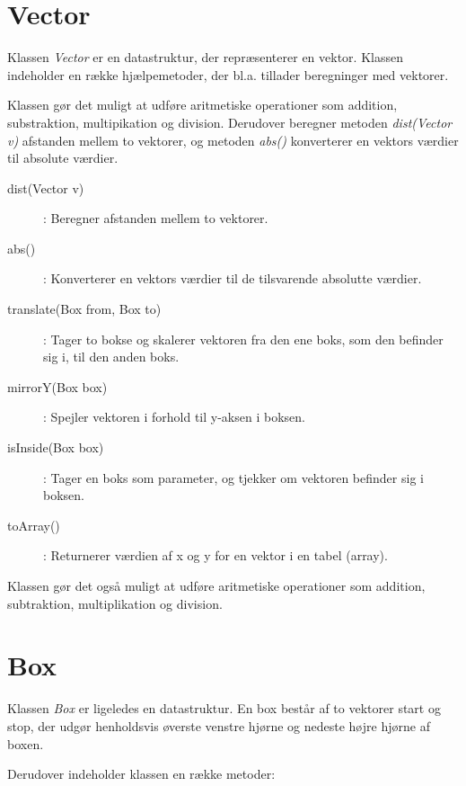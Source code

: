 \section{Vector}

Klassen \emph{Vector} er en datastruktur, der repræsenterer en vektor. Klassen indeholder en række hjælpemetoder, der bl.a. tillader beregninger med vektorer.

Klassen gør det muligt at udføre aritmetiske operationer som addition, substraktion, multipikation og division. Derudover beregner metoden \emph{dist(Vector v)} afstanden mellem to vektorer, og metoden \emph{abs()} konverterer en vektors værdier til absolute værdier.

\begin{description}
	\item [dist(Vector v)]: Beregner afstanden mellem to vektorer.
	\item [abs()]: Konverterer en vektors værdier til de tilsvarende absolutte værdier.
	\item [translate(Box from, Box to)]: Tager to bokse og skalerer vektoren fra den ene boks, som den befinder sig i, til den anden boks.
	\item [mirrorY(Box box)]: Spejler vektoren i forhold til y-aksen i boksen.
	\item [isInside(Box box)]: Tager en boks som parameter, og tjekker om vektoren befinder sig i boksen.
	\item [toArray()]: Returnerer værdien af x og y for en vektor i en tabel (array).
\end{description}

Klassen gør det også muligt at udføre aritmetiske operationer som addition, subtraktion, multiplikation og division. 

\section{Box}

Klassen \emph{Box} er ligeledes en datastruktur. En box består af to vektorer start og stop, der udgør henholdsvis øverste venstre hjørne og nedeste højre hjørne af boxen.

Derudover indeholder klassen en række metoder:

